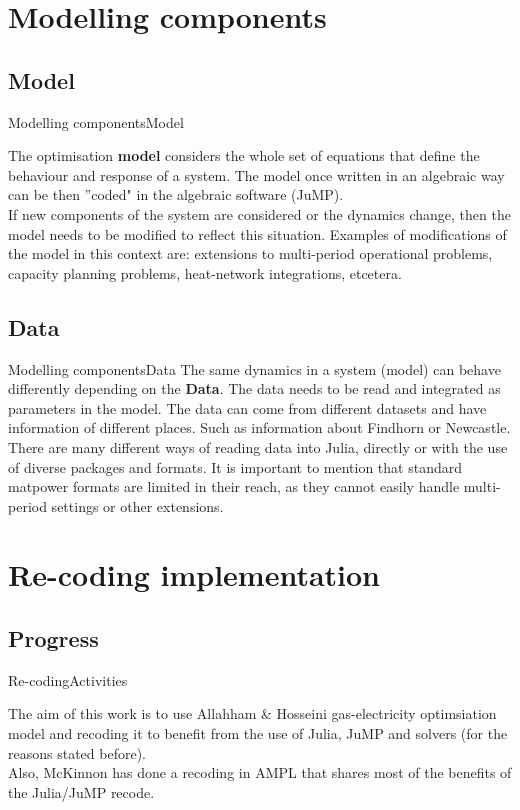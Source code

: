 \documentclass[handout]{beamer}
\begin{document}
\section{Modelling components}

\subsection{Model}
\begin{frame}[t]{Modelling components}{Model}

  The optimisation \textbf{model} considers the whole set of equations that define the behaviour and response of a system. The model once written in an algebraic way can be then ''coded" in the algebraic software (JuMP).\\[6pt]

  If new components of the system are considered or the dynamics change, then the model needs to be modified to reflect this situation. Examples of modifications of the model in this context are: extensions to multi-period operational problems, capacity planning problems, heat-network integrations, etcetera.
\end{frame}

\subsection{Data}
\begin{frame}[t]{Modelling components}{Data}
  The same dynamics in a system (model) can behave differently depending on the \textbf{Data}. The data needs to be read and integrated as parameters in the model. The data can come from different datasets and have information of different places. Such as information about Findhorn or Newcastle.\\[6pt]

  There are many different ways of reading data into Julia, directly or with the use of diverse packages and formats. It is important to mention that standard matpower formats are limited in their reach, as they cannot easily handle multi-period settings or other extensions.

\end{frame}


\section{Re-coding implementation}

\subsection{Progress}
\begin{frame}[t]{Re-coding}{Activities}

The aim of this work is to use Allahham \& Hosseini gas-electricity optimsiation model and recoding it to benefit from the use of Julia, JuMP and solvers (for the reasons stated before). \\[12pt]

Also, McKinnon has done a recoding in AMPL that shares most of the benefits of the Julia/JuMP recode.

\end{frame}
\end{document}
